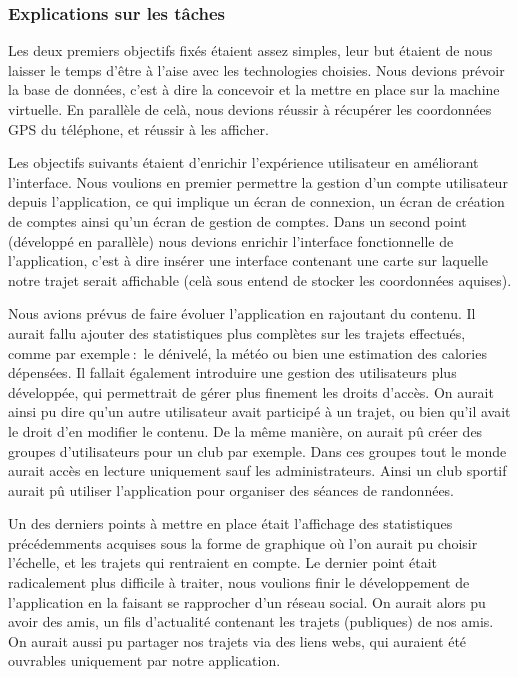 \subsubsection{Explications sur les tâches}
Les deux premiers objectifs fixés étaient assez simples, leur but étaient de nous laisser le temps d'être à l'aise avec les technologies choisies.
Nous devions prévoir la base de données, c'est à dire la concevoir et la mettre en place sur la machine virtuelle. En parallèle de celà, nous devions réussir à récupérer les coordonnées GPS du téléphone, et réussir à les afficher.
\par
Les objectifs suivants étaient d'enrichir l'expérience utilisateur en améliorant l'interface. Nous voulions en premier permettre la gestion d'un compte utilisateur depuis l'application, ce qui implique un écran de connexion, un écran de création de comptes ainsi qu'un écran de gestion de comptes.
Dans un second point (développé en parallèle) nous devions enrichir l'interface fonctionnelle de l'application, c'est à dire insérer une interface contenant une carte sur laquelle notre trajet serait affichable (celà sous entend de stocker les coordonnées aquises).
\par
Nous avions prévus de faire évoluer l'application en rajoutant du contenu. Il aurait fallu ajouter des statistiques plus complètes sur les trajets effectués, comme par exemple$\ :$ le dénivelé, la météo ou bien une estimation des calories dépensées.
Il fallait également introduire une gestion des utilisateurs plus développée, qui permettrait de gérer plus finement les droits d'accès. On aurait ainsi pu dire qu'un autre utilisateur avait participé à un trajet, ou bien qu'il avait le droit d'en modifier le contenu.
De la même manière, on aurait pû créer des groupes d'utilisateurs pour un club par exemple. Dans ces groupes tout le monde aurait accès en lecture uniquement sauf les administrateurs. Ainsi un club sportif aurait pû utiliser l'application pour organiser des séances de randonnées.
\par
Un des derniers points à mettre en place était l'affichage des statistiques précédemments acquises sous la forme de graphique où l'on aurait pu choisir l'échelle, et les trajets qui rentraient en compte.
Le dernier point était radicalement plus difficile à traiter, nous voulions finir le développement de l'application en la faisant se rapprocher d'un réseau social. On aurait alors pu avoir des amis, un fils d'actualité contenant les trajets (publiques) de nos amis. On aurait aussi pu partager
nos trajets via des liens webs, qui auraient été ouvrables uniquement par notre application.
